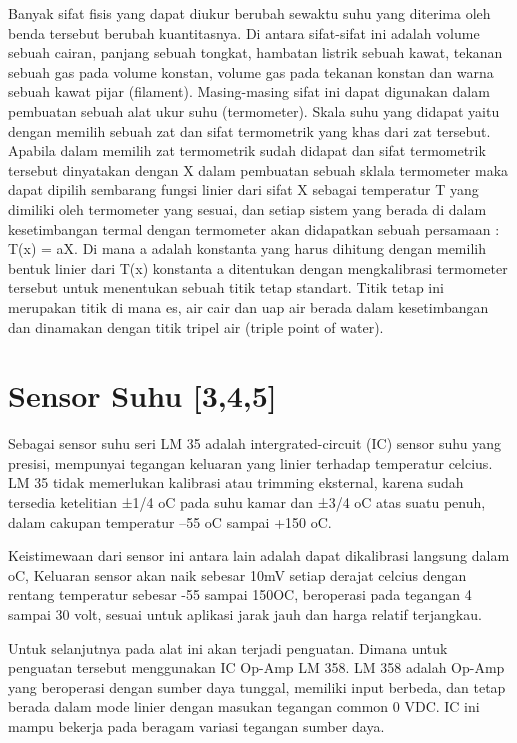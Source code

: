 \documentclass{jtetiproposalskripsi}
\begin{document}
	
	
Banyak sifat fisis yang dapat diukur berubah sewaktu suhu yang diterima oleh benda tersebut berubah kuantitasnya. Di antara sifat-sifat ini adalah volume sebuah cairan, panjang sebuah tongkat, hambatan listrik sebuah kawat, tekanan sebuah gas pada volume konstan, volume gas pada tekanan konstan dan warna sebuah kawat pijar (filament). Masing-masing sifat ini dapat digunakan dalam pembuatan sebuah alat ukur suhu (termometer). Skala suhu yang didapat yaitu dengan memilih sebuah zat dan sifat termometrik yang khas dari zat tersebut. Apabila dalam memilih zat termometrik sudah didapat dan sifat termometrik tersebut dinyatakan dengan X dalam pembuatan sebuah sklala termometer maka dapat dipilih sembarang fungsi linier dari sifat X sebagai temperatur T yang dimiliki oleh termometer yang sesuai, dan setiap sistem yang berada di dalam kesetimbangan termal dengan termometer akan didapatkan sebuah persamaan : T(x) = aX. Di mana a adalah konstanta yang harus dihitung dengan memilih bentuk linier dari T(x) konstanta a ditentukan dengan mengkalibrasi termometer tersebut untuk menentukan sebuah titik tetap standart. Titik tetap ini merupakan titik di mana es, air cair dan uap air berada dalam kesetimbangan dan dinamakan dengan titik tripel air (triple point of water).
	


\section{Sensor Suhu [3,4,5]}

Sebagai sensor suhu seri LM 35 adalah intergrated-circuit (IC) sensor suhu yang presisi, mempunyai tegangan keluaran yang linier terhadap temperatur celcius. LM 35 tidak memerlukan kalibrasi atau trimming eksternal, karena sudah tersedia ketelitian ±1/4 oC pada suhu kamar dan ±3/4 oC atas suatu penuh, dalam cakupan temperatur –55 oC sampai +150 oC.


Keistimewaan dari sensor ini antara lain adalah dapat dikalibrasi langsung dalam oC, Keluaran sensor akan naik sebesar 10mV setiap derajat celcius dengan rentang temperatur sebesar -55 sampai 150OC, beroperasi pada tegangan 4 sampai 30 volt, sesuai untuk aplikasi jarak jauh dan  harga relatif terjangkau.

Untuk selanjutnya pada alat ini akan terjadi penguatan. Dimana untuk penguatan tersebut menggunakan IC Op-Amp LM 358. LM 358 adalah Op-Amp yang beroperasi dengan sumber daya tunggal, memiliki input berbeda, dan tetap berada dalam mode linier dengan masukan tegangan common 0 VDC. IC ini mampu bekerja pada beragam variasi tegangan sumber daya.
\end{document}
